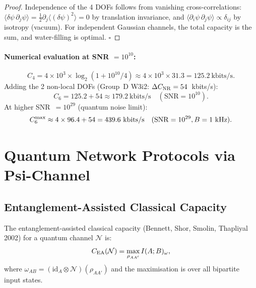 \documentclass[aps,prd,twocolumn,superscriptaddress,nofootinbib]{revtex4-2}
\newcommand{\SNR}{\mathrm{SNR}}
\begin{document}
\begin{proof}
Independence of the 4 DOFs follows from vanishing cross-correlations:
$\langle\delta\psi\,\partial_j\psi\rangle = \frac{1}{2}\partial_j\langle(\delta\psi)^2\rangle = 0$
by translation invariance, and $\langle\partial_i\psi\,\partial_j\psi\rangle \propto \delta_{ij}$
by isotropy (vacuum). For independent Gaussian channels, the total capacity
is the sum, and water-filling is optimal. $\square$
\end{proof}

\paragraph{Numerical evaluation at SNR $= 10^{10}$:}
\begin{equation}
C_4 = 4\times 10^3 \times \log_2(1 + 10^{10}/4) \approx 4\times 10^3 \times 31.3 = 125.2~\text{kbits/s}.
\end{equation}
Adding the 2 non-local DOFs (Group~D W3i2: $\Delta C_{\rm NR} = 54$~kbits/s):
\begin{equation}
C_6 = 125.2 + 54 \approx 179.2~\text{kbits/s} \quad(\SNR = 10^{10}).
\end{equation}
At higher SNR~$= 10^{29}$ (quantum noise limit):
\begin{equation}
C_6^{\rm max} \approx 4 \times 96.4 + 54 = 439.6~\text{kbits/s}
\quad (\SNR = 10^{29}, B = 1~\text{kHz}).
\end{equation}

\section{Quantum Network Protocols via Psi-Channel}
\label{sec:network}

\subsection{Entanglement-Assisted Classical Capacity}

The entanglement-assisted classical capacity (Bennett, Shor, Smolin,
Thapliyal 2002) for a quantum channel $\mathcal{N}$ is:
\begin{equation}
C_{\rm EA}(\mathcal{N}) = \max_{\rho_{AA'}} I(A;B)_\omega,
\end{equation}
where $\omega_{AB} = (\mathrm{id}_A \otimes \mathcal{N})(\rho_{AA'})$
and the maximisation is over all bipartite input states.
\end{document}
